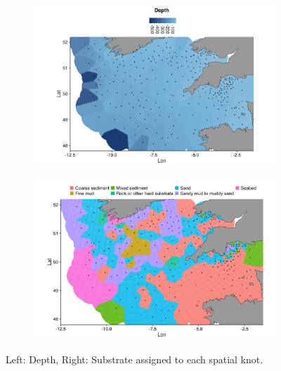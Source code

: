 \documentclass{article}
\begin{document}
\begin{figure}[!ht]
	\label{fig:S3}
\begin{subfigure}{0.55\textwidth}
\includegraphics[width = \linewidth]{"figures/Depth"}
\end{subfigure}	
\begin{subfigure}{0.45\textwidth}
\includegraphics[width = \linewidth]{"figures/Substrate"}
\end{subfigure}
\caption{Left: Depth, Right: Substrate assigned to each spatial knot.}

\end{figure}

\end{document}

